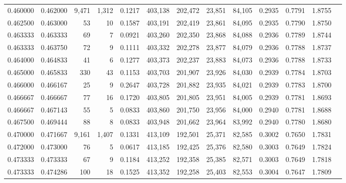 \begin{tabular}{rrrrrrrrrrrrr}
0.460000 & 0.462000 &  9,471 & 1,312 &                                     0.1217 & 403,138 & 202,472 &  23,851 &  84,105 & 0.2935 & 0.7791 & 1.8755 \\
0.462500 & 0.463000 &     53 &    10 &                                     0.1587 & 403,191 & 202,419 &  23,861 &  84,095 & 0.2935 & 0.7790 & 1.8750 \\
0.463333 & 0.463333 &     69 &     7 &                                     0.0921 & 403,260 & 202,350 &  23,868 &  84,088 & 0.2936 & 0.7789 & 1.8744 \\
0.463333 & 0.463750 &     72 &     9 &                                     0.1111 & 403,332 & 202,278 &  23,877 &  84,079 & 0.2936 & 0.7788 & 1.8737 \\
0.464000 & 0.464833 &     41 &     6 &                                     0.1277 & 403,373 & 202,237 &  23,883 &  84,073 & 0.2936 & 0.7788 & 1.8733 \\
0.465000 & 0.465833 &    330 &    43 &                                     0.1153 & 403,703 & 201,907 &  23,926 &  84,030 & 0.2939 & 0.7784 & 1.8703 \\
0.466000 & 0.466167 &     25 &     9 &                                     0.2647 & 403,728 & 201,882 &  23,935 &  84,021 & 0.2939 & 0.7783 & 1.8700 \\
0.466667 & 0.466667 &     77 &    16 &                                     0.1720 & 403,805 & 201,805 &  23,951 &  84,005 & 0.2939 & 0.7781 & 1.8693 \\
0.466667 & 0.467143 &     55 &     5 &                                     0.0833 & 403,860 & 201,750 &  23,956 &  84,000 & 0.2940 & 0.7781 & 1.8688 \\
0.467500 & 0.469444 &     88 &     8 &                                     0.0833 & 403,948 & 201,662 &  23,964 &  83,992 & 0.2940 & 0.7780 & 1.8680 \\
0.470000 & 0.471667 &  9,161 & 1,407 &                                     0.1331 & 413,109 & 192,501 &  25,371 &  82,585 & 0.3002 & 0.7650 & 1.7831 \\
0.472000 & 0.473000 &     76 &     5 &                                     0.0617 & 413,185 & 192,425 &  25,376 &  82,580 & 0.3003 & 0.7649 & 1.7824 \\
0.473333 & 0.473333 &     67 &     9 &                                     0.1184 & 413,252 & 192,358 &  25,385 &  82,571 & 0.3003 & 0.7649 & 1.7818 \\
0.473333 & 0.474286 &    100 &    18 &                                     0.1525 & 413,352 & 192,258 &  25,403 &  82,553 & 0.3004 & 0.7647 & 1.7809 \\

\end{tabular}
